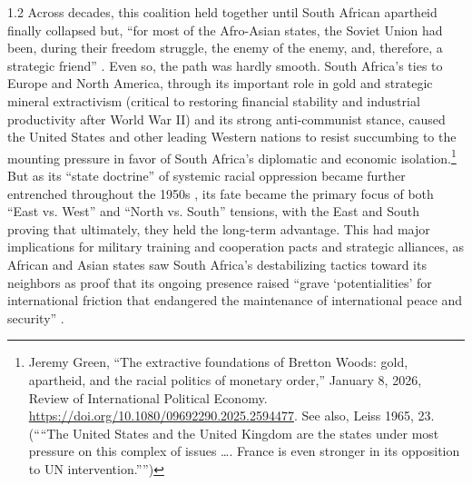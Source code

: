 \documentclass[../unravbook.tex]{subfiles}
\begin{document}
\begin{spacing}{1.2}
Across decades, this coalition held together until South African apartheid finally collapsed but, ``for most of the Afro-Asian states, the Soviet Union had been, during their freedom struggle, the enemy of the enemy, and, therefore, a strategic friend'' \parencite[140]{Bandyopadhyaya-1977}. Even so, the path was hardly smooth. South Africa's ties to Europe and North America, through its important role in gold and strategic mineral extractivism (critical to restoring financial stability and industrial productivity after World War II) and its strong anti-communist stance, caused the United States and other leading Western nations to resist succumbing to the mounting pressure in favor of South Africa's diplomatic and economic isolation.\footnote{Jeremy Green, ``The extractive foundations of Bretton Woods: gold, apartheid, and the racial politics of monetary order,'' January 8, 2026, Review of International Political Economy. \url{https://doi.org/10.1080/09692290.2025.2594477}. See also, Leiss 1965, 23. (\enquote{``The United States and the United Kingdom are the states under most pressure on this complex of issues \ldots. France is even stronger in its opposition to UN intervention.''})} But as its ``state doctrine'' of systemic racial oppression became further entrenched throughout the 1950s \parencite[43]{Klotz-1995}, its fate became the primary focus of both \enquote{East vs. West} and \enquote{North vs. South} tensions, with the East and South proving that ultimately, they held the long-term advantage. This had major implications for military training and cooperation pacts and strategic alliances, as African and Asian states saw South Africa's destabilizing tactics toward its neighbors as proof that its ongoing presence raised \enquote{grave \enquote{potentialities} for international friction that endangered the maintenance of international peace and security} \parencite[47]{Klotz-1995}. 


\end{spacing}
\end{document}
